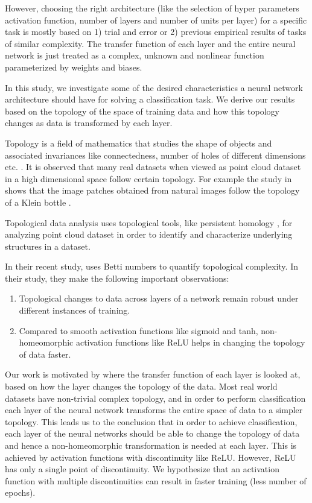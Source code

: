 \documentclass[wcp]{jmlr}
\begin{document}
However, choosing the right architecture (like the  selection  of hyper parameters activation function, number of layers and number of units per layer)  for a specific task is mostly based on 1) trial and error or 2) previous empirical results of tasks of similar complexity. The transfer function of each layer and the entire neural network is just treated as a complex, unknown and nonlinear function parameterized by weights and biases.

In this study,  we investigate some of the  desired characteristics a neural network architecture should have for solving a classification task. We derive our results based on the topology of the space of training data and how this topology changes as data is transformed by each layer.

Topology is a field of mathematics that studies the shape of objects and associated invariances like connectedness, number of holes of different dimensions etc. \cite{betti_number}. It is observed that many real datasets when viewed as point cloud dataset in a high dimensional space follow  certain topology. For example the study  in \cite{carlsson2009topology} shows that the image patches obtained from natural images follow the topology of a Klein bottle \cite{klein_bottle}.

Topological data analysis\cite{carlsson2009topology, chazal2021introduction} uses topological tools, like persistent homology \cite{edelsbrunner2008persistent}, for analyzing point cloud dataset in order to identify and characterize underlying structures in a dataset.

In their recent study, \cite{naitzat2020topology}  uses Betti numbers \cite{betti_number} to quantify topological complexity. In their study, they make the following important observations:

\begin{enumerate}
\item Topological changes to data across layers of a network remain robust under different instances of training.
\item Compared to smooth activation functions like sigmoid and tanh, non-homeomorphic activation functions like ReLU helps in changing the topology of data faster.
\end{enumerate}

Our work is motivated by \cite{naitzat2020topology} where the transfer function of each layer is looked at, based on  how the layer changes the topology of the data. Most real world datasets have non-trivial complex topology, and in order to perform classification each layer of the neural network transforms the entire space of data to a simpler topology. This leads us to the conclusion that in order to achieve classification, each layer of the neural networks should be able to change the topology of data and hence a non-homeomorphic transformation is needed at each layer. This is achieved by activation functions with discontinuity like ReLU. However, ReLU has only a single point of discontinuity. We hypothesize that an activation function with multiple discontinuities can result in faster training (less number of epochs).
\end{document}
